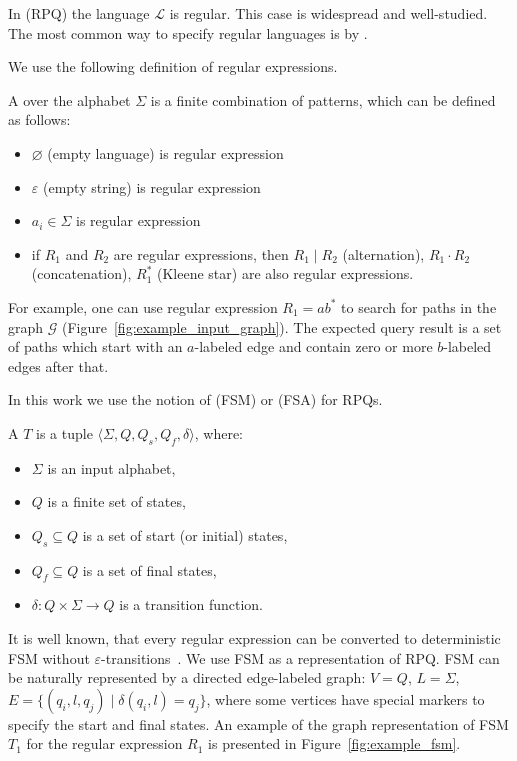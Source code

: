 In  (RPQ) the language $\mathcal{L}$ is regular.
This case is widespread and well-studied.
The most common way to specify regular languages is by .

We use the following definition of regular expressions.
\begin{definition}
A  over the alphabet $\Sigma$ is a finite combination of patterns, which can be defined as follows:
\begin{itemize}
    \item $\varnothing$ (empty language) is regular expression
    \item $\varepsilon$ (empty string) is regular expression
    \item $a_i \in \Sigma$ is regular expression
    \item if $R_1$ and $R_2$ are regular expressions, then $R_1 \mid R_2$ (alternation), $R_1 \cdot R_2$ (concatenation), $R_1^*$ (Kleene star) are also regular expressions. 
\end{itemize}
\end{definition} 

For example, one can use regular expression $R_1 = ab^*$ to search for paths in the graph $\mathcal{G}$ (Figure~\ref{fig:example_input_graph}).
The expected query result is a set of paths which start with an $a$-labeled edge and contain zero or more $b$-labeled edges after that.

In this work we use the notion of  (FSM) or  (FSA) for RPQs.

\begin{definition}
A  $T$ is a tuple $\langle \Sigma, Q, Q_s, Q_f, \delta \rangle$, where:
\begin{itemize}
    \item $\Sigma$ is an input alphabet,
    \item $Q$ is a finite set of states,
    \item $Q_s \subseteq Q$ is a set of start (or initial) states,
    \item $Q_f \subseteq Q$ is a set of final states,
    \item $\delta: Q \times \Sigma \to Q$ is a transition function.
\end{itemize}
\end{definition}

It is well known, that every regular expression can be converted to deterministic FSM without $\varepsilon$-transitions~\cite{automata:theory:10.5555/1177300}.
We use FSM as a representation of RPQ.
FSM can be naturally represented by a directed edge-labeled graph: $V = Q$, $L = \Sigma$, $E = \{(q_i,l,q_j) \mid \delta(q_i,l) = q_j\}$, where some vertices have special markers to specify the start and final states.
An example of the graph representation of FSM $T_1$ for the regular expression $R_1$ is presented in Figure~\ref{fig:example_fsm}.

